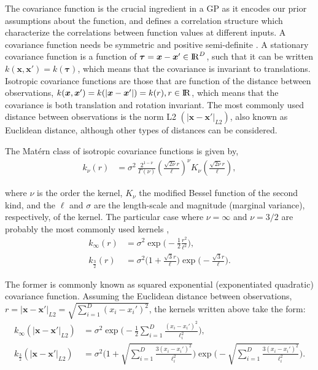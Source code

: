 \documentclass[onecolumn,a4paper,11pt]{article}
\begin{document}
The covariance function is the crucial ingredient in a GP as it encodes our prior assumptions about the function, and defines a correlation structure which characterize the correlations between function values at different inputs. A covariance function needs be symmetric and positive semi-definite \citep{rasmussen2006gaussian}. A stationary covariance function is a function of $\bm{\tau}=\bm{x}-\bm{x}' \in {\rm I\!R}^D$, such that it can be written $k(\bm{x},\bm{x}') = k(\bm{\tau})$, which means that the covariance is invariant to translations. Isotropic covariance functions are those that are function of the distance between observations, $k(\bm{x},\bm{x}') = k(|\bm{x}-\bm{x}'|) = k(r), r\in {\rm I\!R}$, which means that the covariance is both translation and rotation invariant. The most commonly used distance between observations is the norm L2 $(|\bm{x}-\bm{x}'|_{L2})$, also known as Euclidean distance, although other types of distances can be considered. 

The Mat\'ern class of isotropic covariance functions is given by, 
%
\begin{align*}
k_{\nu}(r)&=\sigma^2 \, \frac{2^{1-\nu}}{\Gamma(\nu)}\left(\frac{\sqrt{2\nu}r}{\ell}\right)^{\nu}K_{\nu}\left(\frac{\sqrt{2\nu}r}{\ell}\right),
\end{align*}

\noindent where $\nu$ is the order the kernel, $K_{\nu}$ the modified Bessel function of the second kind, and the $\ell$ and $\sigma$ are the length-scale and magnitude (marginal variance), respectively, of the kernel. The particular case where $\nu=\infty$ and $\nu=3/2$ are probably the most commonly used kernels \citep{rasmussen2006gaussian}, 
%
\begin{align*}
k_{\infty}(r)&=\sigma^2 \exp\bigg(-\frac{1}{2} \frac{r^2}{\ell^2}\bigg),  \\
k_{\frac{3}{2}}(r)&=\sigma^2\bigg(1+\frac{\sqrt{3}r}{\ell}\bigg) \exp\bigg(-\frac{\sqrt{3}r}{\ell}\bigg). 
\end{align*}

\noindent The former is commonly known as squared exponential (exponentiated quadratic) covariance function. Assuming the Euclidean distance between observations, $r=|\bm{x}-\bm{x}'|_{L2}=\sqrt{\sum_{i=1}^{D}(x_i-x_i')^2}$, the kernels written above take the form:
%
\begin{align*}
k_{\infty}(|\bm{x}-\bm{x}'|_{L2})&=\sigma^2 \exp\bigg(-\frac{1}{2} \sum_{i=1}^{D}\frac{(x_i-x_i')^2}{\ell_i^2}\bigg),\\
k_{\frac{3}{2}}(|\bm{x}-\bm{x}'|_{L2})&=\sigma^2 \Bigg(1+\sqrt{\sum_{i=1}^{D}\frac{3(x_i-x_i')^2}{\ell_i^2}}\Bigg)\exp\Bigg(- \sqrt{\sum_{i=1}^{D}\frac{3(x_i-x_i')^2}{\ell_i^2}}\Bigg). \\
\end{align*}
\end{document}
